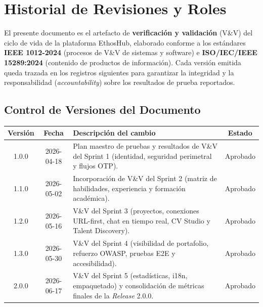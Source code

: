 \chapter*{Historial de Revisiones y Roles}

El presente documento es el artefacto de \textbf{verificación y validación} (V\&V) del
ciclo de vida de la plataforma EthosHub, elaborado conforme a los estándares
\textbf{IEEE 1012-2024} (procesos de V\&V de sistemas y software) e
\textbf{ISO/IEC/IEEE 15289:2024} (contenido de productos de información). Cada versión
emitida queda trazada en los registros siguientes para garantizar la integridad y la
responsabilidad (\textit{accountability}) sobre los resultados de prueba reportados.

\section*{Control de Versiones del Documento}

\vspace{0.2cm}
\noindent
\renewcommand{\arraystretch}{1.4}
\fontsize{9}{10.8}\selectfont\sffamily
\begin{tabularx}{\textwidth}{|c|c|X|c|}
\hline
\rowcolor{headerTabla}
\textbf{Versión} & \textbf{Fecha} & \textbf{Descripción del cambio} & \textbf{Estado} \\
\hline
1.0.0 & 2026-04-18 & Plan maestro de pruebas y resultados de V\&V del Sprint 1 (identidad, seguridad perimetral y flujos OTP). & Aprobado \\
\hline
\rowcolor{grisTecnico}
1.1.0 & 2026-05-02 & Incorporación de V\&V del Sprint 2 (matriz de habilidades, experiencia y formación académica). & Aprobado \\
\hline
1.2.0 & 2026-05-16 & V\&V del Sprint 3 (proyectos, conexiones URL-first, chat en tiempo real, CV Studio y Talent Discovery). & Aprobado \\
\hline
\rowcolor{grisTecnico}
1.3.0 & 2026-05-30 & V\&V del Sprint 4 (visibilidad de portafolio, refuerzo OWASP, pruebas E2E y accesibilidad). & Aprobado \\
\hline
2.0.0 & 2026-06-17 & V\&V del Sprint 5 (estadísticas, i18n, empaquetado) y consolidación de métricas finales de la \textit{Release} 2.0.0. & Aprobado \\
\hline
\end{tabularx}

